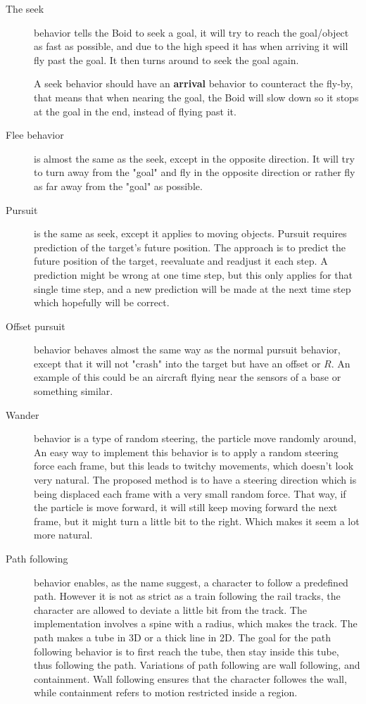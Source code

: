 \begin{description}
\item[The seek]behavior tells the Boid to seek a goal, it will try to reach the goal/object as fast as possible, and due to the high speed it has when arriving it will fly past the goal. It then turns around to seek the goal again.

A seek behavior should have an \textbf{arrival} behavior to counteract the fly-by, that means that when nearing the goal, the Boid will slow down so it stops at the goal in the end, instead of flying past it.

\item [Flee behavior] is almost the same as the seek, except in the opposite direction. It will try to turn away from the "goal" and fly in the opposite direction or rather fly as far away from the "goal" as possible.

\item [Pursuit] is the same as seek, except it applies to moving objects. Pursuit requires prediction of the target's future position. The approach is to predict the future position of the target, reevaluate and readjust it each step. A prediction might be wrong at one time step, but this only applies for that single time step, and a new prediction will be made at the next time step which hopefully will be correct.

\item [Offset pursuit] behavior behaves almost the same way as the normal pursuit behavior, except that it will not "crash" into the target but have an offset or $R$. An example of this could be an aircraft flying near the sensors of a base or something similar. 

\item [Wander] behavior is a type of random steering, the particle move randomly around, An easy way to implement this behavior is to apply a random steering force each frame, but this leads to twitchy movements, which doesn't look very natural. The proposed method is to have a steering direction which is being displaced each frame with a very small random force.
That way, if the particle is move forward, it will still keep moving forward the next frame, but it might turn a little bit to the right. Which makes it seem a lot more natural.

\item [Path following] behavior enables, as the name suggest, a character to follow a predefined path. However it is not as strict as a train following the rail tracks, the character are allowed to deviate a little bit from the track. The implementation involves a spine with a radius, which makes the track. The path makes a tube in 3D or a thick line in 2D. The goal for the path following behavior is to first reach the tube, then stay inside this tube, thus following the path. Variations of path following are wall following, and containment. Wall following ensures that the character followes the wall, while containment refers to motion restricted inside a region.


\end{description}
